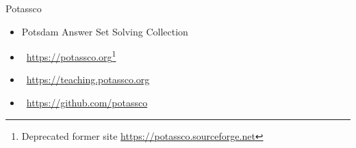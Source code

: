 \begin{frame}[c]{Potassco}
  \begin{itemize}
  \item <1-> Potsdam Answer Set Solving Collection
  \item {} \ \url{https://potassco.org}\footnote{Deprecated former site \url{https://potassco.sourceforge.net}}
  \item {} \ \url{https://teaching.potassco.org}
  \item {}  \ \url{https://github.com/potassco}
  \end{itemize}
\end{frame}
%
